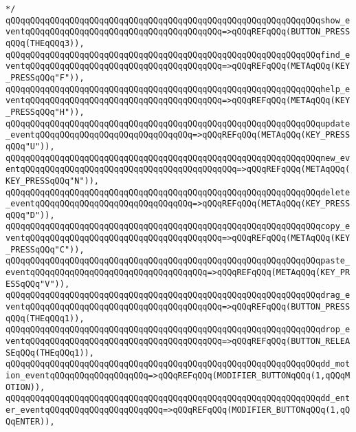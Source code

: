 \verb|*/|\newline
\verb|qQQqqQQqqQQqqQQqqQQqqQQqqQQqqQQqqQQqqQQqqQQqqQQqqQQqqQQqqQQqqQQqshow_eventqQQqqQQqqQQqqQQqqQQqqQQqqQQqqQQqqQQqqQQq=>qQQqREFqQQq(BUTTON_PRESSqQQq(THEqQQq3)),|\newline
\verb|qQQqqQQqqQQqqQQqqQQqqQQqqQQqqQQqqQQqqQQqqQQqqQQqqQQqqQQqqQQqqQQqfind_eventqQQqqQQqqQQqqQQqqQQqqQQqqQQqqQQqqQQqqQQq=>qQQqREFqQQq(METAqQQq(KEY_PRESSqQQq"F")),|\newline
\verb|qQQqqQQqqQQqqQQqqQQqqQQqqQQqqQQqqQQqqQQqqQQqqQQqqQQqqQQqqQQqqQQqhelp_eventqQQqqQQqqQQqqQQqqQQqqQQqqQQqqQQqqQQqqQQq=>qQQqREFqQQq(METAqQQq(KEY_PRESSqQQq"H")),|\newline
\verb|qQQqqQQqqQQqqQQqqQQqqQQqqQQqqQQqqQQqqQQqqQQqqQQqqQQqqQQqqQQqqQQqupdate_eventqQQqqQQqqQQqqQQqqQQqqQQqqQQqqQQq=>qQQqREFqQQq(METAqQQq(KEY_PRESSqQQq"U")),|\newline
\verb|qQQqqQQqqQQqqQQqqQQqqQQqqQQqqQQqqQQqqQQqqQQqqQQqqQQqqQQqqQQqqQQqnew_eventqQQqqQQqqQQqqQQqqQQqqQQqqQQqqQQqqQQqqQQqqQQq=>qQQqREFqQQq(METAqQQq(KEY_PRESSqQQq"N")),|\newline
\verb|qQQqqQQqqQQqqQQqqQQqqQQqqQQqqQQqqQQqqQQqqQQqqQQqqQQqqQQqqQQqqQQqdelete_eventqQQqqQQqqQQqqQQqqQQqqQQqqQQqqQQq=>qQQqREFqQQq(METAqQQq(KEY_PRESSqQQq"D")),|\newline
\verb|qQQqqQQqqQQqqQQqqQQqqQQqqQQqqQQqqQQqqQQqqQQqqQQqqQQqqQQqqQQqqQQqcopy_eventqQQqqQQqqQQqqQQqqQQqqQQqqQQqqQQqqQQqqQQq=>qQQqREFqQQq(METAqQQq(KEY_PRESSqQQq"C")),|\newline
\verb|qQQqqQQqqQQqqQQqqQQqqQQqqQQqqQQqqQQqqQQqqQQqqQQqqQQqqQQqqQQqqQQqpaste_eventqQQqqQQqqQQqqQQqqQQqqQQqqQQqqQQqqQQq=>qQQqREFqQQq(METAqQQq(KEY_PRESSqQQq"V")),|\newline
\newline
\verb|qQQqqQQqqQQqqQQqqQQqqQQqqQQqqQQqqQQqqQQqqQQqqQQqqQQqqQQqqQQqqQQqdrag_eventqQQqqQQqqQQqqQQqqQQqqQQqqQQqqQQqqQQqqQQq=>qQQqREFqQQq(BUTTON_PRESSqQQq(THEqQQq1)),|\newline
\verb|qQQqqQQqqQQqqQQqqQQqqQQqqQQqqQQqqQQqqQQqqQQqqQQqqQQqqQQqqQQqqQQqdrop_eventqQQqqQQqqQQqqQQqqQQqqQQqqQQqqQQqqQQqqQQq=>qQQqREFqQQq(BUTTON_RELEASEqQQq(THEqQQq1)),|\newline
\verb|qQQqqQQqqQQqqQQqqQQqqQQqqQQqqQQqqQQqqQQqqQQqqQQqqQQqqQQqqQQqqQQqdd_motion_eventqQQqqQQqqQQqqQQqqQQq=>qQQqREFqQQq(MODIFIER_BUTTONqQQq(1,qQQqMOTION)),|\newline
\verb|qQQqqQQqqQQqqQQqqQQqqQQqqQQqqQQqqQQqqQQqqQQqqQQqqQQqqQQqqQQqqQQqdd_enter_eventqQQqqQQqqQQqqQQqqQQqqQQq=>qQQqREFqQQq(MODIFIER_BUTTONqQQq(1,qQQqENTER)),|\newline
